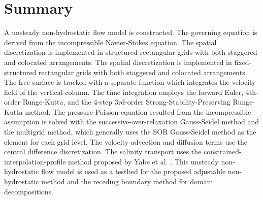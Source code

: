 \normalsize
\section{Summary}


A unsteady non-hydrostatic flow model is constructed. The governing equation is derived from the incompressible Navier-Stokes equation. The spatial discretization is implemented in structured rectangular grids with both staggered and colocated arrangements. The spatial discretization is implemented in fixed-structured rectangular grids with both staggered and colocated arrangements. The free surface is tracked with a separate function which integrates the velocity field of the vertical column. The time integration employs the forward Euler, 4th-order Runge-Kutta, and the 4-step 3rd-order Strong-Stability-Preserving Runge-Kutta method. The pressure-Poisson equation resulted from the incompressible assumption is solved with the successive-over-relaxation Gauss-Seidel method and the multigrid method, which generally uses the SOR Gauss-Seidel method as the element for each grid level. The velocity advection and diffusion terms use the central difference discretization. The salinity transport uses the constrained-interpolation-profile method proposed by Yabe et al. \cite{Yabe1991A, Yabe1991B, Yabe01}. This unsteady non-hydrostatic flow model is used as a testbed for the proposed adjustable non-hydrostatic method and the receding boundary method for domain decompositions.
